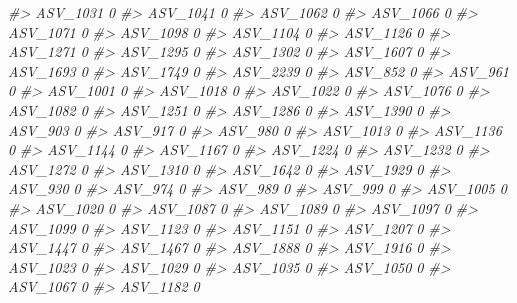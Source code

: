 \documentclass[
]{article}
\newenvironment{Shaded}{\begin{snugshade}}{\end{snugshade}}
\newcommand{\CommentTok}[1]{\textcolor[rgb]{0.56,0.35,0.01}{\textit{#1}}}
\begin{document}
\begin{Shaded}
\begin{Highlighting}[]
\CommentTok{\#\textgreater{} ASV\_1031  0}
\CommentTok{\#\textgreater{} ASV\_1041  0}
\CommentTok{\#\textgreater{} ASV\_1062  0}
\CommentTok{\#\textgreater{} ASV\_1066  0}
\CommentTok{\#\textgreater{} ASV\_1071  0}
\CommentTok{\#\textgreater{} ASV\_1098  0}
\CommentTok{\#\textgreater{} ASV\_1104  0}
\CommentTok{\#\textgreater{} ASV\_1126  0}
\CommentTok{\#\textgreater{} ASV\_1271  0}
\CommentTok{\#\textgreater{} ASV\_1295  0}
\CommentTok{\#\textgreater{} ASV\_1302  0}
\CommentTok{\#\textgreater{} ASV\_1607  0}
\CommentTok{\#\textgreater{} ASV\_1693  0}
\CommentTok{\#\textgreater{} ASV\_1749  0}
\CommentTok{\#\textgreater{} ASV\_2239  0}
\CommentTok{\#\textgreater{} ASV\_852   0}
\CommentTok{\#\textgreater{} ASV\_961   0}
\CommentTok{\#\textgreater{} ASV\_1001  0}
\CommentTok{\#\textgreater{} ASV\_1018  0}
\CommentTok{\#\textgreater{} ASV\_1022  0}
\CommentTok{\#\textgreater{} ASV\_1076  0}
\CommentTok{\#\textgreater{} ASV\_1082  0}
\CommentTok{\#\textgreater{} ASV\_1251  0}
\CommentTok{\#\textgreater{} ASV\_1286  0}
\CommentTok{\#\textgreater{} ASV\_1390  0}
\CommentTok{\#\textgreater{} ASV\_903   0}
\CommentTok{\#\textgreater{} ASV\_917   0}
\CommentTok{\#\textgreater{} ASV\_980   0}
\CommentTok{\#\textgreater{} ASV\_1013  0}
\CommentTok{\#\textgreater{} ASV\_1136  0}
\CommentTok{\#\textgreater{} ASV\_1144  0}
\CommentTok{\#\textgreater{} ASV\_1167  0}
\CommentTok{\#\textgreater{} ASV\_1224  0}
\CommentTok{\#\textgreater{} ASV\_1232  0}
\CommentTok{\#\textgreater{} ASV\_1272  0}
\CommentTok{\#\textgreater{} ASV\_1310  0}
\CommentTok{\#\textgreater{} ASV\_1642  0}
\CommentTok{\#\textgreater{} ASV\_1929  0}
\CommentTok{\#\textgreater{} ASV\_930   0}
\CommentTok{\#\textgreater{} ASV\_974   0}
\CommentTok{\#\textgreater{} ASV\_989   0}
\CommentTok{\#\textgreater{} ASV\_999   0}
\CommentTok{\#\textgreater{} ASV\_1005  0}
\CommentTok{\#\textgreater{} ASV\_1020  0}
\CommentTok{\#\textgreater{} ASV\_1087  0}
\CommentTok{\#\textgreater{} ASV\_1089  0}
\CommentTok{\#\textgreater{} ASV\_1097  0}
\CommentTok{\#\textgreater{} ASV\_1099  0}
\CommentTok{\#\textgreater{} ASV\_1123  0}
\CommentTok{\#\textgreater{} ASV\_1151  0}
\CommentTok{\#\textgreater{} ASV\_1207  0}
\CommentTok{\#\textgreater{} ASV\_1447  0}
\CommentTok{\#\textgreater{} ASV\_1467  0}
\CommentTok{\#\textgreater{} ASV\_1888  0}
\CommentTok{\#\textgreater{} ASV\_1916  0}
\CommentTok{\#\textgreater{} ASV\_1023  0}
\CommentTok{\#\textgreater{} ASV\_1029  0}
\CommentTok{\#\textgreater{} ASV\_1035  0}
\CommentTok{\#\textgreater{} ASV\_1050  0}
\CommentTok{\#\textgreater{} ASV\_1067  0}
\CommentTok{\#\textgreater{} ASV\_1182  0}

\end{Highlighting}
\end{Shaded}
\end{document}
